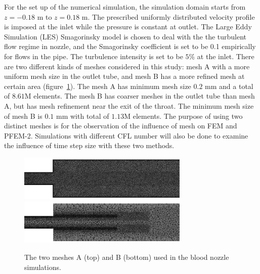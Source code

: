 For the set up of the numerical simulation, the simulation domain starts from $z=-0.18$ m to $z=0.18$ m. The prescribed uniformly distributed velocity profile is imposed at the inlet while the pressure is constant at outlet. The Large Eddy Simulation (LES) Smagorinsky model is chosen to deal with the the turbulent flow regime in nozzle, and the Smagorinsky coefficient is set to be 0.1 empirically for flows in the pipe. The turbulence intensity is set to be $5$\% at the inlet. There are two different kinds of meshes considered in this study: mesh A with a more uniform mesh size in the outlet tube, and mesh B has a more refined mesh at certain area (figure~\ref{fig:nozzlemesh}). The mesh A has minimum mesh size $0.2$ mm and a total of $8.61$M elements. The mesh B has coarser meshes in the outlet tube than mesh A, but has mesh refinement near the exit of the throat. The minimum mesh size of mesh B is $0.1$ mm with total of $1.13$M elements. The purpose of using two distinct meshes is for the observation of the influence of mesh on FEM and PFEM-2. Simulations with different CFL number will also be done to examine the influence of time step size with these two methods.

\begin{figure}[htbp]
    \centering
    \includegraphics[width=3.2in]{imgs/nozzle_pump/nozzle_fmesh.pdf}
    \includegraphics[width=3.2in]{imgs/nozzle_pump/nozzle_pmesh.pdf}
    \caption{The two meshes A (top) and B (bottom) used in the blood nozzle simulations.}
    \label{fig:nozzlemesh}
\end{figure}


